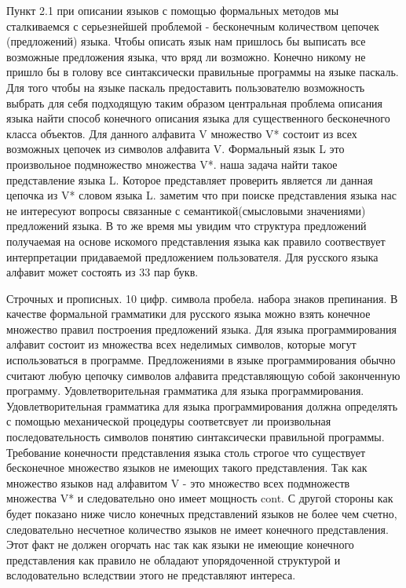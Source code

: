 {Пункт 2.1 при описании языков с помощью формальных методов мы сталкиваемся с серьезнейшей проблемой - бесконечным количеством цепочек (предложений) языка.
Чтобы описать язык нам пришлось бы выписать все возможные предложения языка, что вряд ли возможно. Конечно никому не пришло бы в голову все синтаксически правильные программы на языке паскаль. Для того чтобы на языке паскаль предоставить пользователю возможность выбрать для себя подходящую таким образом центральная проблема описания языка найти способ конечного описания языка для существенного бесконечного класса объектов.
Для данного алфавита V  множество V* состоит из всех возможных цепочек из символов алфавита V.
Формальный язык L это произвольное подмножество множества V*. наша задача найти такое представление языка L. Которое представляет проверить является ли данная цепочка из V* словом языка L.
заметим что при поиске представления языка нас не интересуют вопросы связанные с семантикой(смысловыми значениями) предложений языка. В то же время мы увидим что структура предложений получаемая на основе искомого представления языка как правило соотвествует интерпретации придаваемой предложением пользователя. Для русского языка алфавит может состоять из 33 пар букв.

Строчных и прописных. 10 цифр. символа пробела. набора знаков препинания. В качестве формальной грамматики для русского языка можно взять конечное множество правил построения предложений языка. Для языка программирования алфавит состоит из множества всех неделимых символов, которые могут использоваться в программе. Предложениями в языке программирования обычно считают любую цепочку символов алфавита представляющую собой законченную программу. Удовлетворительная грамматика для языка программирования. Удовлетворительная грамматика для языка программирования должна определять с помощью механической процедуры соответсвует ли произвольная последовательность символов понятию синтаксически правильной программы. Требование конечности представления языка столь строгое что существует бесконечное множество языков не имеющих такого представления. Так как множество языков над алфавитом V - это множество всех подмножеств множества V* и следовательно оно имеет мощность cont. С другой стороны  как будет показано ниже число конечных представлений языков не более чем счетно, следовательно несчетное количество языков не имеет конечного представления. Этот факт не должен огорчать нас так как языки не имеющие конечного представления как правило не обладают упорядоченной структурой и вслодовательно вследствии этого не представляют интереса.

}
